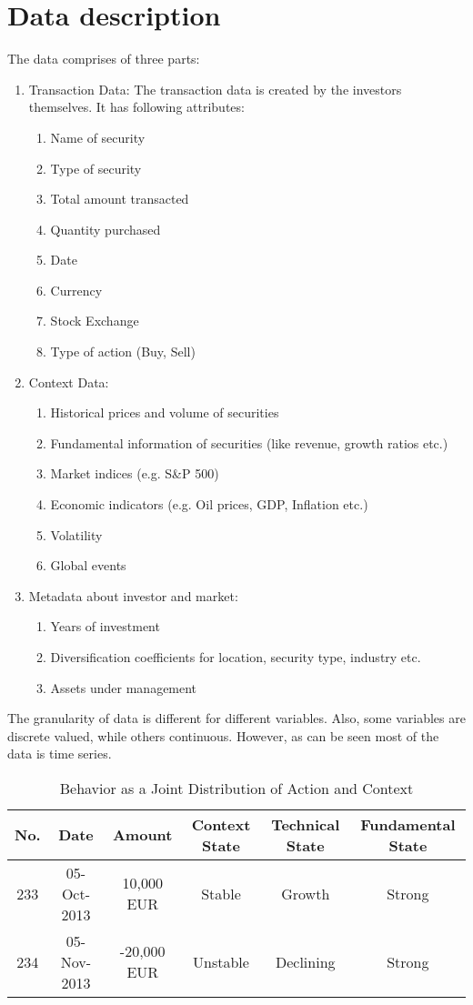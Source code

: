 \documentclass[a4paper]{article}
\begin{document}
\section{Data description}
\label{sec:theory}
The data comprises of three parts:
\begin{enumerate}
\item Transaction Data: The transaction data is created by the investors themselves. It has following attributes:
\begin{enumerate}
  \item{Name of security}
  \item{Type of security}
  \item{Total amount transacted}
  \item{Quantity purchased}
  \item{Date}
  \item{Currency}
  \item{Stock Exchange}
  \item{Type of action (Buy, Sell)}
\end{enumerate}
\item Context Data: 
\begin{enumerate}
  \item{Historical prices and volume of securities}
  \item{Fundamental information of securities (like revenue, growth ratios etc.)}
  \item{Market indices (e.g. S\&P 500)}
  \item{Economic indicators (e.g. Oil prices, GDP, Inflation etc.)}
  \item{Volatility}
  \item{Global events}
\end{enumerate}
\item Metadata about investor and market:
\begin{enumerate}
  \item{Years of investment}
  \item{Diversification coefficients for location, security type, industry etc.}
  \item{Assets under management}
\end{enumerate}
\end{enumerate}
The granularity of data is different for different variables. Also, some variables are discrete valued, while others continuous. However, as can be seen most of the data is time series.
\begin{table}[!htbp]
\centering
\caption{Behavior as a Joint Distribution of Action and Context}
\begin{tabular}{|c|c|c|c|c|c|} \hline
No. & Date & Amount & Context State & Technical State & Fundamental State\\ \hline
233 & 05-Oct-2013 & 10,000 EUR & Stable & Growth & Strong\\
234 & 05-Nov-2013 & -20,000 EUR & Unstable & Declining & Strong\\\hline
\hline\end{tabular}
\end{table}
\end{document}

